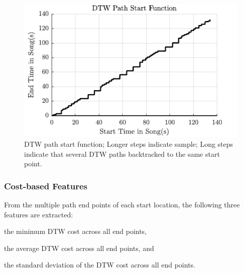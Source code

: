 \documentclass{article}
\begin{document}
\begin{figure}[t]
\centering
\includegraphics[width=\linewidth]{step.pdf}
\caption{DTW path start function; Longer steps indicate sample; Long steps indicate that several DTW paths backtracked to the same start point.}
\label{fig4}
\end{figure}


\subsubsection{Cost-based Features}
From the multiple path end points of each start location, the following three features are extracted: 
\begin{inparaenum}[(i)]
    \item   the minimum DTW cost across all end points,
    \item   the average DTW cost across all end points, and
    \item   the standard deviation of the DTW cost across all end points.
\end{inparaenum}
\end{document}
